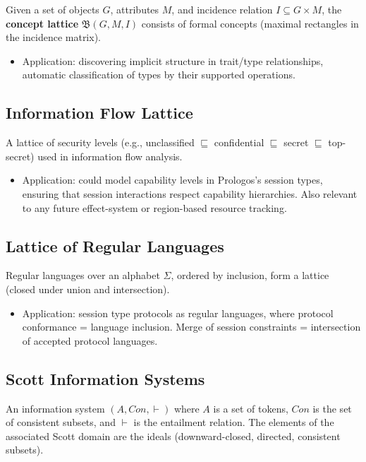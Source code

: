 \documentclass[11pt]{article}
\begin{document}
Given a set of objects \(G\), attributes \(M\), and incidence relation \(I \subseteq G
\times M\), the \textbf{concept lattice} \(\mathfrak{B}(G, M, I)\) consists of formal
concepts (maximal rectangles in the incidence matrix).

\begin{itemize}
\item Application: discovering implicit structure in trait/type relationships,
automatic classification of types by their supported operations.
\end{itemize}
\subsection{Information Flow Lattice}
\label{sec:org16c035c}

A lattice of security levels (e.g., unclassified \(\sqsubseteq\) confidential
\(\sqsubseteq\) secret \(\sqsubseteq\) top-secret) used in information flow
analysis.

\begin{itemize}
\item Application: could model capability levels in Prologos's session types,
ensuring that session interactions respect capability hierarchies. Also
relevant to any future effect-system or region-based resource tracking.
\end{itemize}
\subsection{Lattice of Regular Languages}
\label{sec:org8ca626e}

Regular languages over an alphabet \(\Sigma\), ordered by inclusion, form a
lattice (closed under union and intersection).

\begin{itemize}
\item Application: session type protocols as regular languages, where protocol
conformance = language inclusion. Merge of session constraints = intersection
of accepted protocol languages.
\end{itemize}
\subsection{Scott Information Systems}
\label{sec:org298c143}

An information system \((A, Con, \vdash)\) where \(A\) is a set of tokens, \(Con\) is
the set of consistent subsets, and \(\vdash\) is the entailment relation. The
elements of the associated Scott domain are the ideals (downward-closed, directed,
consistent subsets).
\end{document}
